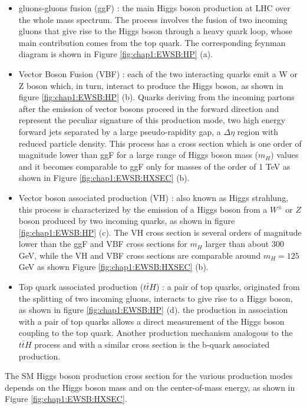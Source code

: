 \begin{itemize}
	\item gluons-gluons fusion (ggF) : the main Higgs boson production at LHC over the whole mass spectrum. The process involves the fusion of two incoming gluons that give rise to the Higgs boson through a heavy quark loop, whose main contribution comes from the top quark. The corresponding feynman diagram is shown in Figure \ref{fig:chap1:EWSB:HP} (a).  
	\item Vector Boson Fusion (VBF) : each of the two interacting quarks emit a W or Z boson which, in turn, interact to produce the Higgs boson, as shown in figure \ref{fig:chap1:EWSB:HP} (b). Quarks deriving from the incoming partons after the emission of vector bosons proceed in the forward direction and represent the peculiar signature of this production mode, two high energy forward jets separated by a large pseudo-rapidity gap, a $\Delta\eta$ region with reduced particle density. This process has a cross section which is one order of magnitude lower than ggF for a large range of Higgs boson mass ($m_H$) values and it becomes comparable to ggF only for masses of the order of 1 TeV as shown in Figure \ref{fig:chap1:EWSB:HXSEC} (b).
	\item Vector boson associated production (VH) : also known as Higgs strahlung, this process is characterized by the emission of a Higgs boson from a $W^{\pm}$ or $Z$ boson produced by two incoming quarks, as shown in figure \ref{fig:chap1:EWSB:HP} (c). The VH cross section is several orders of magnitude lower than the ggF and VBF cross sections for $m_H$ larger than about 300 GeV, while the VH and VBF cross sections are comparable around $m_H = 125$ GeV as shown Figure \ref{fig:chap1:EWSB:HXSEC} (b).
	\item Top quark associated production ($t\bar{t}H$) : a pair of top quarks, originated from the splitting of two incoming gluons, interacts to give rise to a Higgs boson, as shown in figure \ref{fig:chap1:EWSB:HP} (d). the production in association with a pair of top quarks allows a direct measurement of the Higgs boson coupling to the top quark. Another production mechanism analogous to the $t\bar{t}H$ process and with a similar cross section is the b-quark associated production.
\end{itemize}
The SM Higgs boson production cross section for the various production modes depends on the Higgs boson mass and on the center-of-mass energy, as shown in Figure \ref{fig:chap1:EWSB:HXSEC}.  
